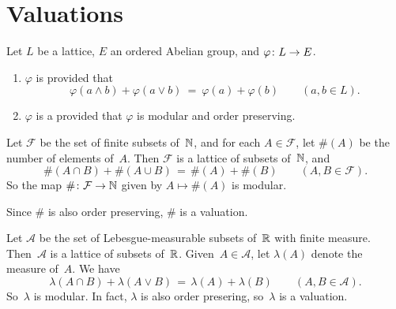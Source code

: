 \documentclass[main.tex]{subfiles}
\begin{document}
\section{Valuations}
\noindent
%
%
\begin{dfn}
\label{D:val}
Let $L$ be a lattice, $E$ an ordered Abelian group,
and $\varphi\colon L \rightarrow E$.
\begin{enumerate}
\item
\label{D:val-mod}
$\varphi$ is  provided that
\begin{equation*}
\varphi(a\wedge b) + \varphi(a \vee b)
\ =\ 
\varphi(a) + \varphi(b)
\qquad(a,b\in L).
\end{equation*}

\item
\label{D:val-val}
$\varphi$ is a 
provided that $\varphi$ is modular and order preserving.
\end{enumerate}
\end{dfn}

\begin{ex}
Let $\mathcal{F}$ be the set of finite subsets of~$\mathbb{N}$,
and for each $A\in \mathcal{F}$,
let $\#(A)$ be the number of elements of~$A$.
Then
$\mathcal{F}$ is a lattice of subsets of~$\mathbb{N}$,
and
\begin{equation*}
\#(A\cap B) + \#(A\cup B) \,=\, \#(A) + \#(B)
\qquad(A,B\in\mathcal{F}).
\end{equation*}
So the map $\#\colon \mathcal{F}\rightarrow \mathbb{N}$
given by $A\mapsto \#(A)$ is modular.

Since $\#$ is also order preserving,
$\#$ is a valuation.
\end{ex}

\begin{ex}
Let $\mathcal{A}$ be the set of Lebesgue-measurable
subsets of~$\mathbb{R}$ with finite measure.
Then~$\mathcal{A}$ is a lattice of subsets of~$\mathbb{R}$.
Given~$A\in\mathcal{A}$,
let $\lambda(A)$ denote the measure of~$A$.
We have 
\begin{equation*}
\lambda(A\cap B) + \lambda(A\vee B) \,=\, \lambda(A) + \lambda(B)
\qquad(A,B\in\mathcal{A}).
\end{equation*}
So~$\lambda$ is modular.
In fact, $\lambda$ is also order presering,
so~$\lambda$ is a valuation.
\end{ex}
\end{document}
